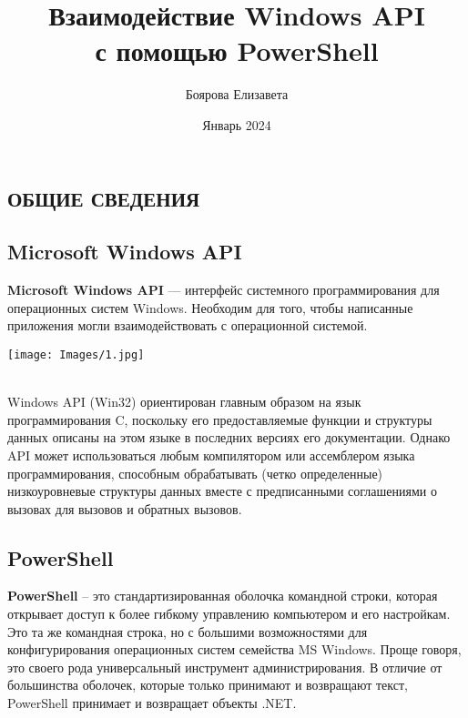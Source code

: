 \documentclass[12pt, a4paper, twoside]{article}
\title{Взаимодействие Windows API\\
с помощью PowerShell}
\author{Боярова Елизавета}
\date{Январь 2024}
\begin{document}
\maketitle

\newpage
\begin{center}
\tableofcontents 
\end{center}

\newpage
\begin{center}
\section{ОБЩИЕ СВЕДЕНИЯ}
\subsection{Microsoft Windows API}
\end{center}

\textbf{Microsoft Windows API} — интерфейс системного программирования для операционных систем Windows. 
Необходим для того, чтобы написанные приложения могли взаимодействовать с операционной системой.\\

\begin{center}
\texttt{[image: Images/1.jpg]}
\end{center}\\

Windows API (Win32) ориентирован главным образом на язык программирования C, поскольку его предоставляемые функции и структуры данных описаны на этом языке в последних версиях его документации. Однако API может использоваться любым компилятором или ассемблером языка программирования, способным обрабатывать (четко определенные) низкоуровневые структуры данных вместе с предписанными соглашениями о вызовах для вызовов и обратных вызовов.

\begin{center}
\subsection{PowerShell}
\end{center}

\textbf{PowerShell} – это стандартизированная оболочка командной строки, которая открывает доступ к более гибкому управлению компьютером и его настройкам. Это та же командная строка, но с большими возможностями для конфигурирования операционных систем семейства MS Windows. Проще говоря, это своего рода универсальный инструмент администрирования. 
В отличие от большинства оболочек, которые только принимают и возвращают текст, PowerShell принимает и возвращает объекты 
\colorbox{light-gray}{.NET}.\\
\end{document}
